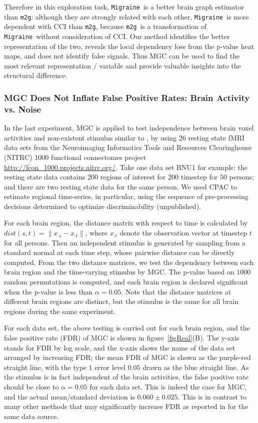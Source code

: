 \documentclass[11pt]{article}
\providecommand{\sct}[1]{{\sc \texttt{#1}}}
\newcommand{\Migraine}{\sct{Migraine}}
\newcommand{\mtg}{\sct{m2g}}
\begin{document}
Therefore in this exploration task, \Migraine~is a better brain graph estimator than \mtg: although they are strongly related with each other, \Migraine~is more dependent with CCI than \mtg, because \mtg~is a transformation of \Migraine~without consideration of CCI. Our method identifies the better representation of the two, reveals the local dependency loss from the p-value heat maps, and does not identify false signals. Thus MGC can be used to find the most relevant representation / variable and provide valuable insights into the structural difference.

\subsubsection{MGC Does Not Inflate False Positive Rates: Brain Activity vs. Noise}

In the last experiment, MGC is applied to test independence between brain voxel activities and non-existent stimulus similar to \cite{EklundKnutsson2012}, by using $26$ resting state fMRI data sets from the Neuroimaging Informatics Tools and Resources Clearinghouse (NITRC) 1000 functional connectomes project \url{http://fcon_1000.projects.nitrc.org/}. Take one data set BNU1 for example: the resting state data contains $200$ regions of interest for $200$ timestep for $50$ persons; and there are two resting state data for the same person. We used CPAC to estimate regional time-series, in particular, using the sequence of pre-processing decisions determined to optimize discriminability (unpublished).

For each brain region, the distance matrix with respect to time is calculated by $dist(s,t)=\|x_{\cdot s}-x_{\cdot t}\|$, where $x_{\cdot t}$ denote the observation vector at timestep $t$ for all persons. Then an independent stimulus is generated by sampling from a standard normal at each time step, whose pairwise distance can be directly computed. From the two distance matrices, we test the dependency between each brain region and the time-varying stimulus by MGC. The p-value based on $1000$ random permutations is computed, and each brain region is declared significant when the p-value is less than $\alpha=0.05$. Note that the distance matrices at different brain regions are distinct, but the stimulus is the same for all brain regions during the same experiment.

For each data set, the above testing is carried out for each brain region, and the false positive rate (FDR) of MGC is shown in figure~\ref{figReal}(B). The y-axis stands for FDR by log scale, and the x-axis shows the name of the data set arranged by increasing FDR; the mean FDR of MGC is shown as the purple-red straight line, with the type $1$ error level $0.05$ drawn as the blue straight line. As the stimulus is in fact independent of the brain activities, the false positive rate should be close to $\alpha=0.05$ for each data set. This is indeed the case for MGC, and the actual mean/standard deviation is $0.060 \pm 0.025$. This is in contrast to many other methods that may significantly increase FDR as reported in \cite{EklundKnutsson2012} for the same data source.
\end{document}
